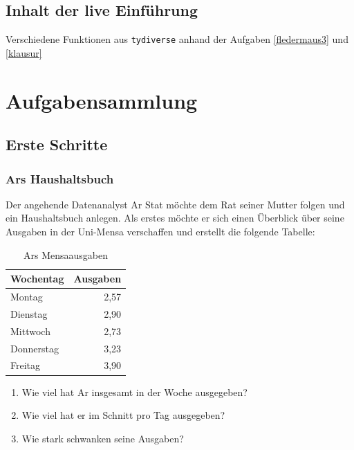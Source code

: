 \documentclass[]{book}
\providecommand{\tightlist}{%
  \setlength{\itemsep}{0pt}\setlength{\parskip}{0pt}}
\begin{document}
\hypertarget{inhalt-der-live-einfuxfchrung-5}{%
\section{Inhalt der live Einführung}\label{inhalt-der-live-einfuxfchrung-5}}

Verschiedene Funktionen aus \texttt{tydiverse} anhand der Aufgaben \ref{fledermaus3} und \ref{klausur}

\hypertarget{aufgabensammlung}{%
\chapter{Aufgabensammlung}\label{aufgabensammlung}}

\hypertarget{erste-schritte}{%
\section{Erste Schritte}\label{erste-schritte}}

\hypertarget{ars-haushaltsbuch}{%
\subsection{Ars Haushaltsbuch}\label{ars-haushaltsbuch}}

Der angehende Datenanalyst Ar Stat möchte dem Rat seiner Mutter folgen und ein Haushaltsbuch anlegen. Als erstes möchte er sich einen Überblick über seine Ausgaben in der Uni-Mensa verschaffen und erstellt die folgende Tabelle:

\begin{table}

\caption{\label{tab:unnamed-chunk-61}Ars Mensaausgaben}
\centering
\begin{tabular}[t]{lr}
\toprule
Wochentag & Ausgaben\\
\midrule
Montag & 2,57\\
Dienstag & 2,90\\
Mittwoch & 2,73\\
Donnerstag & 3,23\\
Freitag & 3,90\\
\bottomrule
\end{tabular}
\end{table}

\begin{enumerate}
\def\labelenumi{\arabic{enumi}.}
\tightlist
\item
  Wie viel hat Ar insgesamt in der Woche ausgegeben?
\item
  Wie viel hat er im Schnitt pro Tag ausgegeben?
\item
  Wie stark schwanken seine Ausgaben?
\end{enumerate}
\end{document}
